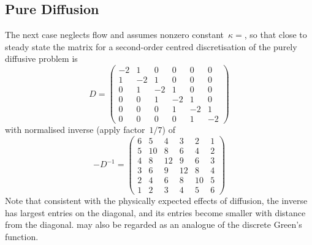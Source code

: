 \subsection{Pure Diffusion}\label{sec:puredi}
The next case neglects flow and assumes nonzero constant~$\kappa=$, so that close to steady state
the matrix for a second-order centred discretisation of the purely diffusive problem is
\begin{equation}\label{eq:mat7}
D=\begin{pmatrix}
-2 & 1 & 0 & 0 & 0 & 0\\
1 & -2 & 1 & 0 & 0 & 0\\
0 & 1 & -2 & 1 & 0 & 0 \\
0 & 0 & 1 & -2 & 1 & 0\\
0 & 0 & 0 & 1 & -2 & 1\\
0 & 0 & 0 & 0 & 1 & -2
\end{pmatrix}
\end{equation}
with normalised inverse (apply factor~$1/7$) of
\begin{equation}\label{eq:mat6}
-D^{-1}=\begin{pmatrix}
6 & 5 & 4 & 3 & 2 & 1\\
5 & 10 & 8 & 6 & 4 & 2\\
4 & 8 & 12 & 9 & 6 & 3\\
3 & 6 & 9 & 12 & 8 & 4\\
2 & 4 & 6 & 8 & 10 & 5 \\
1 & 2 & 3 & 4 & 5 & 6
\end{pmatrix}
\end{equation}
Note that consistent with the physically expected  effects of diffusion, the inverse has largest entries on
the diagonal, and its entries become smaller with distance from the diagonal.  may
also be regarded as an analogue of the discrete Green's function.

